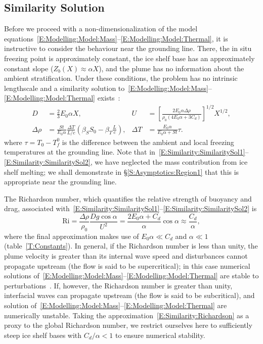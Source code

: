 \documentclass{jfm}
\begin{document}
\subsection{Similarity Solution}\label{S:Model:SimilaritySolution}
Before we proceed with a non-dimensionalization of the model equations~\eqref{E:Modelling:Model:Mass}--\eqref{E:Modelling:Model:Thermal}, it is instructive to consider the behaviour near the grounding line. There, the in situ freezing point is approximately constant, the ice shelf base has an approximately constant slope ($Z_b(X) \approx \alpha X$), and the plume has no information about the ambient stratification. Under these conditions, the problem has no intrinsic lengthscale and a similarity solution to~\eqref{E:Modelling:Model:Mass}--\eqref{E:Modelling:Model:Thermal} exists~\citep{Magorrian2016JGeoResOcean}:
\begin{align}
D &= \frac{2}{3}E_0 \alpha X, & U &= \left[\frac{2E_0 \alpha \Delta \rho}{\rho_0 \left(4E_0 \alpha + 3 C_d\right)}\right]^{1/2}X^{1/2},\label{E:Similarity:SimilaritySol1}\\
 \Delta \rho &= \frac{St}{E_0 \alpha}\frac{\Delta T}{L/c}\left(\beta_S S_0 - \beta_T \frac{L}{c}\right), & \Delta T &= \frac{E_0 \alpha}{E_0 \alpha + St}\tau.\label{E:Similarity:SimilaritySol2}
\end{align}
where $\tau = T_0 - T_{f}^0$ is the difference between the ambient and local freezing temperatures at the grounding line.  Note that in~\eqref{E:Similarity:SimilaritySol1}--\eqref{E:Similarity:SimilaritySol2}, we have neglected the mass contribution from ice shelf melting; we shall demonstrate in \S\ref{S:Asymptotics:Region1} that this is appropriate near the grounding line.

The Richardson number, which quantifies the relative strength of buoyancy and drag, associated with~\eqref{E:Similarity:SimilaritySol1}--\eqref{E:Similarity:SimilaritySol2} is
\begin{equation}\label{E:Similarity:Richardson}
\mathrm{Ri} = \frac{\Delta \rho}{\rho_0}\frac{D g \cos \alpha}{U^2} = \frac{2E_0 \alpha + C_d}{\alpha} \cos \alpha \approx \frac{C_d}{\alpha},
\end{equation}
where the final approximation makes use of $E_0 \alpha \ll C_d$ and $\alpha \ll 1$ (table~\ref{T:Constants}). In general, if the Richardson number is less than unity, the plume velocity is greater than its internal wave speed and disturbances cannot propagate upstream (the flow is said to be supercritical); in this case numerical solutions of~\eqref{E:Modelling:Model:Mass}--\eqref{E:Modelling:Model:Thermal} are stable to perturbations~\citep{Jenkinsphdthesis}. If, however, the Richardson number is greater than unity, interfacial waves can propagate upstream (the flow is said to be subcritical), and solution of~\eqref{E:Modelling:Model:Mass}--\eqref{E:Modelling:Model:Thermal} are numerically unstable. Taking the approximation~\eqref{E:Similarity:Richardson} as a proxy to the global Richardson number, we restrict ourselves here to sufficiently steep ice shelf bases with $C_d/\alpha < 1$ to ensure numerical stability.
\end{document}
